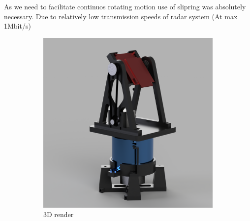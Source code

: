 As we need to facilitate continuos rotating motion use of slipring was absolutely necessary.
Due to relatively low transmission speeds of radar system (At max 1Mbit/s)


\begin{figure}[h!]
    \centering
    \begin{subfigure}[b]{0.45\textwidth}
        \centering
        \includegraphics[width=\textwidth]{../img/whole_assembly_2.png} %
        \caption{3D render}
    \end{subfigure}
    \hspace{0.05\textwidth} %
    \begin{subfigure}[b]{0.45\textwidth}
        \centering

\end{subfigure}
\end{figure}
